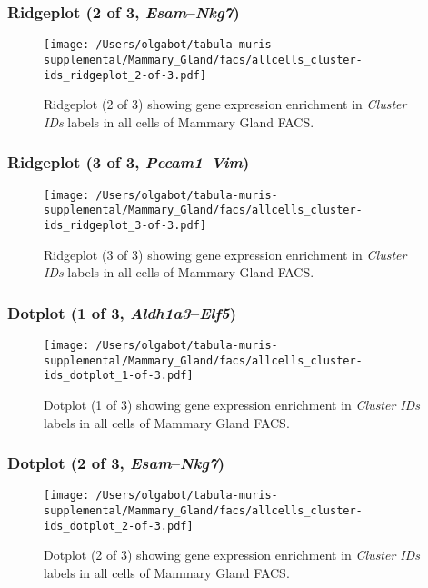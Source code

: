\clearpage

\subsubsection{Ridgeplot (2 of 3, \emph{Esam}--\emph{Nkg7})}
\begin{figure}[h]
\centering
\texttt{[image: /Users/olgabot/tabula-muris-supplemental/Mammary\_Gland/facs/allcells\_cluster-ids\_ridgeplot\_2-of-3.pdf]}

\caption{ Ridgeplot (2 of 3)  showing gene expression enrichment in \emph{Cluster IDs} labels in all cells of Mammary Gland FACS. }
\end{figure}


\clearpage

\subsubsection{Ridgeplot (3 of 3, \emph{Pecam1}--\emph{Vim})}
\begin{figure}[h]
\centering
\texttt{[image: /Users/olgabot/tabula-muris-supplemental/Mammary\_Gland/facs/allcells\_cluster-ids\_ridgeplot\_3-of-3.pdf]}

\caption{ Ridgeplot (3 of 3)  showing gene expression enrichment in \emph{Cluster IDs} labels in all cells of Mammary Gland FACS. }
\end{figure}


\clearpage

\subsubsection{Dotplot (1 of 3, \emph{Aldh1a3}--\emph{Elf5})}
\begin{figure}[h]
\centering
\texttt{[image: /Users/olgabot/tabula-muris-supplemental/Mammary\_Gland/facs/allcells\_cluster-ids\_dotplot\_1-of-3.pdf]}

\caption{ Dotplot (1 of 3)  showing gene expression enrichment in \emph{Cluster IDs} labels in all cells of Mammary Gland FACS. }
\end{figure}


\clearpage

\subsubsection{Dotplot (2 of 3, \emph{Esam}--\emph{Nkg7})}
\begin{figure}[h]
\centering
\texttt{[image: /Users/olgabot/tabula-muris-supplemental/Mammary\_Gland/facs/allcells\_cluster-ids\_dotplot\_2-of-3.pdf]}

\caption{ Dotplot (2 of 3)  showing gene expression enrichment in \emph{Cluster IDs} labels in all cells of Mammary Gland FACS. }
\end{figure}


